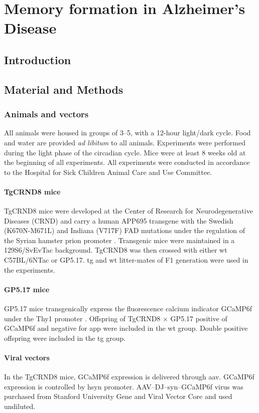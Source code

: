 \chapter{Memory formation in Alzheimer's Disease}
\section{Introduction}

\section{Material and Methods}

\subsection{Animals and vectors}
All animals were housed in groups of 3--5, with a 12-hour light/dark cycle. Food and water are provided \textit{ad libitum} to all animals. Experiments were performed during the light phase of the circadian cycle. Mice were at least 8 weeks old at the beginning of all experiments. All experiments were conducted in accordance to the Hospital for Sick Children Animal Care and Use Committee.

\subsubsection{TgCRND8 mice}
TgCRND8 mice were developed at the Center of Research for Neurodegenerative Diseases (CRND) and carry a human APP695 transgene with the Swedish (K670N-M671L) and Indiana (V717F) FAD mutations under the regulation of the Syrian hamster prion promoter \citep{chishti01}. Transgenic mice were maintained in a 129S6/SvEvTac background. TgCRND8 was then crossed with either \gls{wt} C57BL/6NTac or GP5.17. \Gls{tg} and \gls{wt} litter-mates of F1 generation were used in the experiments.


\subsubsection{GP5.17 mice}
GP5.17 mice transgenically express the fluorescence calcium indicator GCaMP6f under the Thy1 promoter \citep{dana14}. Offspring of TgCRND8 $\times$ GP5.17 positive of GCaMP6f and negative for \gls{app} were included in the \gls{wt} group. Double positive offspring were included in the \gls{tg} group.


\subsubsection{Viral vectors}
In the TgCRND8 mice, GCaMP6f expression is delivered through \gls{aav}. GCaMP6f expression is controlled by \gls{hsyn} promoter. AAV--DJ--syn--GCaMP6f virus was purchased from Stanford University Gene and Viral Vector Core and used undiluted. 

